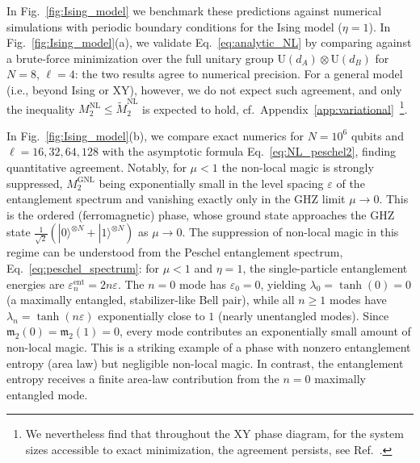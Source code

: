 \documentclass[prx,twocolumn,superscriptaddress,aps,10pt, frontmatterverbose, reprint,footinbib,longbibliography=true]{revtex4-2}
\providecommand{\DIFaddtex}[1]{{\protect\color{red}\uwave{#1}}} %
\providecommand{\DIFdeltex}[1]{{\protect\color{red}\sout{#1}}}                      %
\providecommand{\DIFaddbegin}{\protect\color{red}} %
\providecommand{\DIFaddend}{\protect\color{black}} %
\providecommand{\DIFdelbegin}{} %
\providecommand{\DIFdelend}{} %
\providecommand{\DIFadd}[1]{\texorpdfstring{\DIFaddtex{#1}}{#1}} %
\providecommand{\DIFdel}[1]{\texorpdfstring{\DIFdeltex{#1}}{}} %
\newcommand{\DIFscaledelfig}{0.5}
\newlength{\DIFdelgraphicswidth} %
\newlength{\DIFdelgraphicsheight} %
\newcommand{\DIFaddincludegraphics}[2][]{{\color{blue}\fbox{\DIFOincludegraphics[#1]{#2}}}} %
\newcommand{\DIFdelincludegraphics}[2][]{%
\sbox{\DIFdelgraphicsbox}{\DIFOincludegraphics[#1]{#2}}%
\settoboxwidth{\DIFdelgraphicswidth}{\DIFdelgraphicsbox} %
\settoboxtotalheight{\DIFdelgraphicsheight}{\DIFdelgraphicsbox} %
\scalebox{\DIFscaledelfig}{%
\parbox[b]{\DIFdelgraphicswidth}{\usebox{\DIFdelgraphicsbox}\\[-\baselineskip] \rule{\DIFdelgraphicswidth}{0em}}\llap{\resizebox{\DIFdelgraphicswidth}{\DIFdelgraphicsheight}{%
\setlength{\unitlength}{\DIFdelgraphicswidth}%
\begin{picture}(1,1)%
\thicklines\linethickness{2pt} %
{\color[rgb]{1,0,0}\put(0,0){\framebox(1,1){}}}%
{\color[rgb]{1,0,0}\put(0,0){\line( 1,1){1}}}%
{\color[rgb]{1,0,0}\put(0,1){\line(1,-1){1}}}%
\end{picture}%
}\hspace*{3pt}}} %
} %
\DeclareRobustCommand{\DIFaddbegin}{\DIFOaddbegin \let\includegraphics\DIFaddincludegraphics} %
\DeclareRobustCommand{\DIFaddend}{\DIFOaddend \let\includegraphics\DIFOincludegraphics} %
\DeclareRobustCommand{\DIFdelbegin}{\DIFOdelbegin \let\includegraphics\DIFdelincludegraphics} %
\DeclareRobustCommand{\DIFdelend}{\DIFOaddend \let\includegraphics\DIFOincludegraphics} %
\begin{document}
In Fig.~\ref{fig:Ising_model} we benchmark these predictions against numerical simulations with periodic boundary conditions for the Ising model ($\eta=1$).
In Fig.~\ref{fig:Ising_model}(a), we validate Eq.~\eqref{eq:analytic_NL} by comparing against a brute-force minimization over the full unitary group $\mathrm{U}(d_A)\otimes\mathrm{U}(d_B)$ for $N=8$, $\ell=4$: the two results agree to numerical precision. For a general model (i.e., beyond Ising or XY), however, we do not expect such agreement, and only the inequality
\DIFdelbegin \DIFdel{$M_2^{\mathrm{NL}}\le \widetilde{M}_2^{\mathrm{NL}}$ }\DIFdelend \DIFaddbegin \DIFadd{$M_2^{\mathrm{NL}}\le M_2^{\mathrm{GNL}}$ }\DIFaddend is expected to hold,
cf.~Appendix~\ref{app:variational}~\footnote{We nevertheless find that throughout the XY phase
diagram, for the system sizes accessible to exact minimization, the agreement persists, see Ref.~\cite{zenodo}.}.

In Fig.~\ref{fig:Ising_model}(b), we compare exact numerics for $N=10^6$ qubits and $\ell = 16,32,64,128$ with the asymptotic formula Eq.~\eqref{eq:NL_peschel2}, finding quantitative agreement. Notably, for $\mu<1$ the non-local magic is strongly suppressed, $M_2^{\mathrm{GNL}}$ being exponentially small in the level spacing $\varepsilon$ of the entanglement spectrum and vanishing exactly only in the GHZ limit $\mu\to0$. This is the ordered (ferromagnetic) phase, whose ground state approaches the GHZ state $\frac{1}{\sqrt{2}}(|0\rangle^{\otimes N}+|1\rangle^{\otimes N})$ as $\mu\to 0$. The suppression of non-local magic in this regime can be understood from the Peschel entanglement spectrum, Eq.~\eqref{eq:peschel_spectrum}: for $\mu<1$ and $\eta=1$, the single-particle entanglement energies are $\varepsilon_n^{\mathrm{ent}}=2n\varepsilon$. The $n=0$ mode has $\varepsilon_0=0$, yielding $\lambda_0=\tanh(0)=0$ (a maximally entangled, stabilizer-like Bell pair), while all $n\ge 1$ modes have $\lambda_n=\tanh(n\varepsilon)$ exponentially close to $1$ (nearly unentangled modes). Since $\mathfrak{m}_2(0)=\mathfrak{m}_2(1)=0$, every mode contributes an exponentially small amount of non-local magic. This is a striking example of a phase with nonzero entanglement entropy (area law) but negligible  non-local magic. In contrast, the entanglement entropy receives a finite area-law contribution from the $n=0$ maximally entangled mode.
\end{document}
